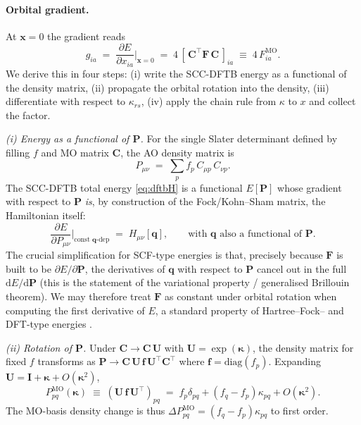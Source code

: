 \documentclass[11pt,a4paper]{article}
\newcommand{\kkappa}{\bm{\kappa}}
\newcommand{\xx}{\mathbf{x}}
\newcommand{\FF}{\mathbf{F}}
\newcommand{\CC}{\mathbf{C}}
\newcommand{\UU}{\mathbf{U}}
\newcommand{\II}{\mathbf{I}}
\newcommand{\qq}{\mathbf{q}}
\begin{document}
\paragraph{Orbital gradient.}
At $\xx=0$ the gradient reads
\begin{equation}
g_{ia} \;=\; \frac{\partial E}{\partial x_{ia}}\bigg|_{\xx=0}
\;=\; 4\,[\,\CC^\top \FF \,\CC\,]_{ia}
\;\equiv\; 4\, F^\mathrm{MO}_{ia}.
\label{eq:grad}
\end{equation}
We derive this in four steps: (i) write the SCC-DFTB energy as a
functional of the density matrix, (ii) propagate the orbital rotation
into the density, (iii) differentiate with respect to $\kappa_{rs}$,
(iv) apply the chain rule from $\kappa$ to $x$ and collect the factor.

\emph{(i) Energy as a functional of $\mathbf{P}$.}
For the single Slater determinant defined by filling $f$ and MO matrix
$\CC$, the AO density matrix is
\begin{equation}
P_{\mu\nu} \;=\; \sum_p f_p\, C_{\mu p}\, C_{\nu p}.
\label{eq:densitymat}
\end{equation}
The SCC-DFTB total energy \eqref{eq:dftbH} is a functional
$E[\mathbf{P}]$ whose gradient with respect to $\mathbf{P}$ \emph{is},
by construction of the Fock/Kohn--Sham matrix, the Hamiltonian itself:
\begin{equation}
\frac{\partial E}{\partial P_{\mu\nu}}\bigg|_{\text{const }\qq\text{-dep}} \;=\; H_{\mu\nu}[\qq],
\qquad \text{with } \qq \text{ also a functional of } \mathbf{P}.
\label{eq:dEdP}
\end{equation}
The crucial simplification for SCF-type energies is that, precisely
because $\FF$ is built to be $\partial E/\partial\mathbf{P}$, the
derivatives of $\qq$ with respect to $\mathbf{P}$ cancel out in the
full $\mathrm{d}E/\mathrm{d}\mathbf{P}$ (this is the statement of the
variational property / generalised Brillouin theorem). We may
therefore treat $\FF$ as constant under orbital rotation when computing
the first derivative of $E$, a standard property of Hartree--Fock-- and
DFT-type energies \cite[Ch.~10]{HelgakerBook}.

\emph{(ii) Rotation of $\mathbf{P}$.}
Under $\CC\to\CC\,\UU$ with $\UU=\exp(\kkappa)$, the density matrix
for fixed $f$ transforms as
$\mathbf{P}\to\CC\,\UU\,\mathbf{f}\,\UU^{\top}\CC^{\top}$ where
$\mathbf{f}=\mathrm{diag}(f_p)$. Expanding $\UU=\II+\kkappa+O(\kkappa^2)$,
\begin{equation}
P^\mathrm{MO}_{pq}(\kkappa)
\;\equiv\; (\UU\,\mathbf{f}\,\UU^{\top})_{pq}
\;=\; f_p\delta_{pq} + (f_q - f_p)\kappa_{pq} + O(\kkappa^2).
\label{eq:Pmo-rot}
\end{equation}
The MO-basis density change is thus
$\Delta P^\mathrm{MO}_{pq} = (f_q-f_p)\kappa_{pq}$ to first order.
\end{document}
